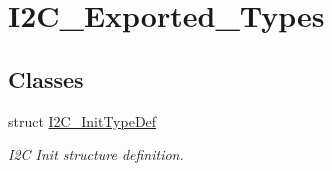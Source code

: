 \hypertarget{group__I2C__Exported__Types}{
\section{I2C\_\-Exported\_\-Types}
\label{group__I2C__Exported__Types}
}
\subsection*{Classes}
\begin{DoxyCompactItemize}
\item 
struct \hyperlink{structI2C__InitTypeDef}{I2C\_\-InitTypeDef}
\begin{DoxyCompactList}\small\item\em I2C Init structure definition. \item\end{DoxyCompactList}\end{DoxyCompactItemize}
